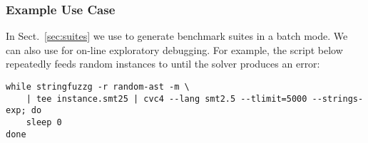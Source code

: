 \subsubsection{Example Use Case}
In Sect.~\ref{sec:suites} we use \fuzzer{} to generate benchmark suites in a batch mode.
We can also use \fuzzer{} for on-line exploratory debugging. 
For example, the script below repeatedly feeds random \fuzzer{} 
instances to \cvc{} until the solver produces an error:
{\scriptsize\begin{verbatim}
while stringfuzzg -r random-ast -m \
    | tee instance.smt25 | cvc4 --lang smt2.5 --tlimit=5000 --strings-exp; do
    sleep 0
done\end{verbatim}}
